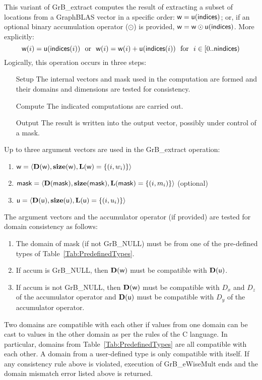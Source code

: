 This variant of {\sf GrB\_extract} computes the result of extracting a subset of
locations from a GraphBLAS vector in a specific order: 
${\sf w} = {\sf u}({\sf indices})$; or, if an optional binary accumulation 
operator ($\odot$) is provided, ${\sf w} = {\sf w} \odot {\sf u}({\sf indices})$.  
More explicitly:
\[
    {\sf w}(i) = {\sf u}({\sf indices}(i)) \mbox{~~or~~} 
    {\sf w}(i) = {\sf w}(i) + {\sf u}({\sf indices}(i))
    \mbox{~~for~~} i \in \left[0..{\sf nindices}\right)
\]  
Logically, this operation occurs in three steps:
\begin{enumerate}[leftmargin=0.75in]
\item[Setup] The internal vectors and mask used in the computation are formed 
and their domains and dimensions are tested for consistency.
\item[Compute] The indicated computations are carried out.
\item[Output] The result is written into the output vector, possibly under 
control of a mask.
\end{enumerate}

Up to three argument vectors are used in the {\sf GrB\_extract} operation:
\begin{enumerate}
	\item ${\sf w} = \langle \bold{D}({\sf w}),\bold{size}({\sf w}),\bold{L}({\sf w}) = \{(i,w_i) \} \rangle$
	\item ${\sf mask} = \langle \bold{D}({\sf mask}),\bold{size}({\sf mask}),\bold{L}({\sf mask}) = \{(i,m_i) \} \rangle$ (optional)
	\item ${\sf u} = \langle \bold{D}({\sf u}),\bold{size}({\sf u}),\bold{L}({\sf u}) = \{(i,u_i) \} \rangle$
\end{enumerate}

The argument vectors and the accumulator 
operator (if provided) are tested for domain consistency as follows:
\begin{enumerate}
	\item The domain of {\sf mask} (if not {\sf GrB\_NULL}) must be from one of the pre-defined types of Table~\ref{Tab:PredefinedTypes}.

	\item If {\sf accum} is {\sf GrB\_NULL}, then $\bold{D}({\sf w})$ must be 
    compatible with $\bold{D}({\sf u})$.

	\item If {\sf accum} is not {\sf GrB\_NULL}, then $\bold{D}({\sf w})$ must be
    compatible with $D_x$ and $D_z$ of the accumulator operator and 
    $\bold{D}({\sf u})$ must be compatible with $D_y$ of the accumulator operator.
\end{enumerate}
Two domains are compatible with each other if values from one domain can be cast 
to values in the other domain as per the rules of the C language.
In particular, domains from Table~\ref{Tab:PredefinedTypes} are all compatible 
with each other. A domain from a user-defined type is only compatible with itself.
If any consistency rule above is violated, execution of {\sf GrB\_eWiseMult} ends
and the domain mismatch error listed above is returned.

